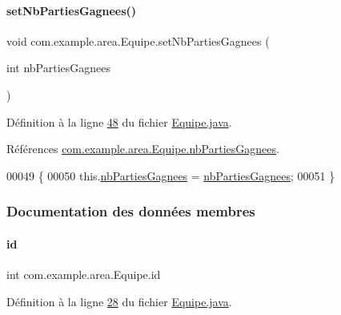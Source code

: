 \paragraph{\texorpdfstring{set\+Nb\+Parties\+Gagnees()}{setNbPartiesGagnees()}}
{\footnotesize\ttfamily void com.\+example.\+area.\+Equipe.\+set\+Nb\+Parties\+Gagnees (\begin{DoxyParamCaption}\item[{int}]{nb\+Parties\+Gagnees }\end{DoxyParamCaption})}



Définition à la ligne \hyperlink{_equipe_8java_source_l00048}{48} du fichier \hyperlink{_equipe_8java_source}{Equipe.\+java}.



Références \hyperlink{_equipe_8java_source_l00025}{com.\+example.\+area.\+Equipe.\+nb\+Parties\+Gagnees}.


\begin{DoxyCode}
00049     \{
00050       this.\hyperlink{classcom_1_1example_1_1area_1_1_equipe_af01e154be3aaa3fbcf909c3a44734b2e}{nbPartiesGagnees} = \hyperlink{classcom_1_1example_1_1area_1_1_equipe_af01e154be3aaa3fbcf909c3a44734b2e}{nbPartiesGagnees};
00051     \}
\end{DoxyCode}


\subsubsection{Documentation des données membres}
\mbox{\label{classcom_1_1example_1_1area_1_1_equipe_a3be17f443cb57269d595d8b860acc66a}} 
\paragraph{\texorpdfstring{id}{id}}
{\footnotesize\ttfamily int com.\+example.\+area.\+Equipe.\+id\hspace{0.3cm}{\ttfamily [private]}}



Définition à la ligne \hyperlink{_equipe_8java_source_l00028}{28} du fichier \hyperlink{_equipe_8java_source}{Equipe.\+java}.

\mbox{\label{classcom_1_1example_1_1area_1_1_equipe_a3b61c78bfb4284470bc3b5315b6b03e7}} 

